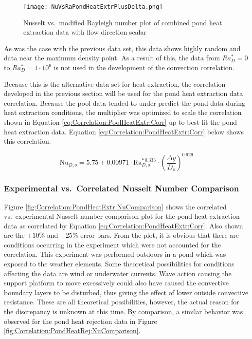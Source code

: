 	\begin{figure}
		\centering
		\texttt{[image: NuVsRaPondHeatExtrPlusDelta.png]}
		\caption{Nusselt vs.\ modified Rayleigh number plot of combined pond heat extraction data with flow direction scalar}
		\label{fig:Correlation:PondHeatExtr:NuVsRaPlusDelta}
		\end{figure}
		
As was the case with the previous data set, this data shows highly random and data near the maximum density point. As a result of this, the data from $Ra_D^* = 0$ to $Ra_D^* = 1 \cdot 10^6$ is not used in the development of the convection correlation.
		
Because this is the alternative data set for heat extraction, the correlation developed in the previous section will be used for the pond heat extraction data correlation. Because the pool data tended to under predict the pond data during heat extraction conditions, the multiplier was optimized to scale the correlation shown in Equation \ref{eq:Correlation:PoolHeatExtr:Corr} up to best fit the pond heat extraction data. Equation \ref{eq:Correlation:PondHeatExtr:Corr} below shows this correlation.

	\begin{equation}
		\mbox{Nu}_{D,o} = 5.75 + 0.00971 \cdot \mbox{Ra}_{D,o}^{* \, 0.333} \cdot \left(\frac{\Delta y}{D_o}\right)^{0.929}
	\label{eq:Correlation:PondHeatExtr:Corr}
	\end{equation}
	
\subsubsection{Experimental vs.\ Correlated Nusselt Number Comparison}

Figure \ref{fig:Correlation:PondHeatExtr:NuComparison} shows the correlated vs.\ experimental Nusselt number comparison plot for the pond heat extraction data as correlated by Equation \ref{eq:Correlation:PondHeatExtr:Corr}. Also shown are the $\pm10\%$ and $\pm25\%$ error bars. From the plot, it is obvious that there are conditions occurring in the experiment which were not accounted for the correlation. This experiment was performed outdoors in a pond which was exposed to the weather elements. Some theoretical possibilities for conditions affecting the data are wind or underwater currents. Wave action causing the support platform to move excessively could also have caused the convective boundary layers to be disturbed, thus giving the effect of lower outside convective resistance. These are all theoretical possibilities, however, the actual reason for the discrepancy is unknown at this time. By comparison, a similar behavior was observed for the pond heat rejection data in Figure \ref{fig:Correlation:PondHeatRej:NuComparison}. 

